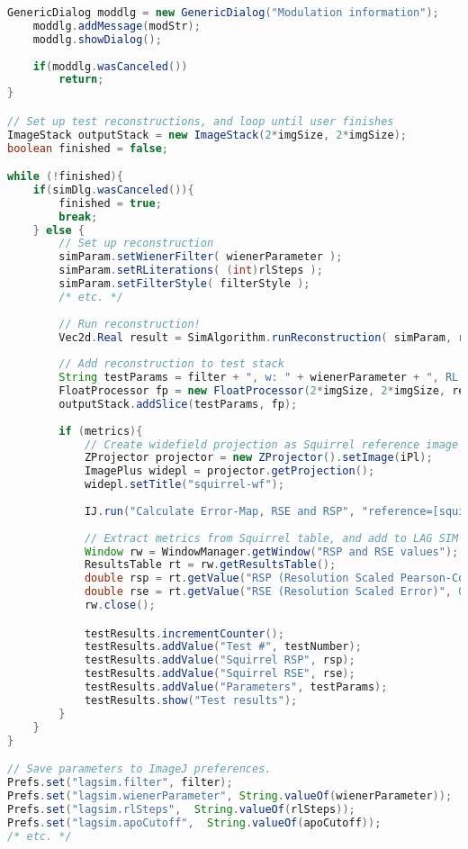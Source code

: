 \begin{lstlisting}[language=java,caption={Extracts from the Beanshell script used for the LAG SIM parameter tester},label={snip:lagsim-fiji},frame=single]
	GenericDialog moddlg = new GenericDialog("Modulation information");
	moddlg.addMessage(modStr);
	moddlg.showDialog();
						
	if(moddlg.wasCanceled())
		return;
}

// Set up test reconstructions, and loop until user finishes
ImageStack outputStack = new ImageStack(2*imgSize, 2*imgSize);
boolean finished = false;

while (!finished){
	if(simDlg.wasCanceled()){
		finished = true;
		break;
	} else {
		// Set up reconstruction
		simParam.setWienerFilter( wienerParameter );
		simParam.setRLiterations( (int)rlSteps );
		simParam.setFilterStyle( filterStyle );
		/* etc. */
		
		// Run reconstruction! 
		Vec2d.Real result = SimAlgorithm.runReconstruction( simParam, rawImages, idf, visualFeedback, otfBeforeShift, clipscale, null);
		
		// Add reconstruction to test stack
		String testParams = filter + ", w: " + wienerParameter + ", RL: " + (int)rlSteps + ", apoC: " + apoCutoff + ", apoS: " + apoBend + ", at?: " + (otfAttenuation ? "true" : "false") + ", attFW: " + attenFWHM +  ", atS: " + attenStrength; 
		FloatProcessor fp = new FloatProcessor(2*imgSize, 2*imgSize, res);
		outputStack.addSlice(testParams, fp);
		
		if (metrics){
			// Create widefield projection as Squirrel reference image
			ZProjector projector = new ZProjector().setImage(iPl);
			ImagePlus widepl = projector.getProjection();
			widepl.setTitle("squirrel-wf");
		
			IJ.run("Calculate Error-Map, RSE and RSP", "reference=[squirrel-wf] super-resolution=[squirrel-sr] rsf=[-- RSF unknown, estimate via optimisation --] max.=5 crop enable maximum=0 show show_rsf-convolved");
		
			// Extract metrics from Squirrel table, and add to LAG SIM test table
			Window rw = WindowManager.getWindow("RSP and RSE values");
			ResultsTable rt = rw.getResultsTable();
			double rsp = rt.getValue("RSP (Resolution Scaled Pearson-Correlation)", 0);
			double rse = rt.getValue("RSE (Resolution Scaled Error)", 0);
			rw.close();

			testResults.incrementCounter();
			testResults.addValue("Test #", testNumber);
			testResults.addValue("Squirrel RSP", rsp);
			testResults.addValue("Squirrel RSE", rse);
			testResults.addValue("Parameters", testParams);
			testResults.show("Test results");		
		}
	}
}

// Save parameters to ImageJ preferences. 
Prefs.set("lagsim.filter", filter);
Prefs.set("lagsim.wienerParameter", String.valueOf(wienerParameter));
Prefs.set("lagsim.rlSteps",  String.valueOf(rlSteps));
Prefs.set("lagsim.apoCutoff",  String.valueOf(apoCutoff));
/* etc. */

\end{lstlisting}